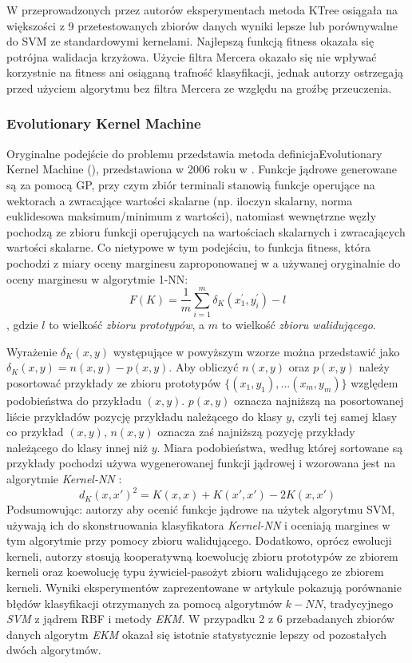W przeprowadzonych przez autorów eksperymentach metoda KTree osiągała na większości z 9 przetestowanych zbiorów danych wyniki lepsze lub porównywalne do SVM ze standardowymi kernelami. Najlepszą funkcją fitness okazała się potrójna walidacja krzyżowa. Użycie filtra Mercera okazało się nie wpływać korzystnie na fitness ani osiąganą trafność klasyfikacji, jednak autorzy ostrzegają przed użyciem algorytmu bez filtra Mercera ze względu na groźbę przeuczenia.

\subsubsection{Evolutionary Kernel Machine}
Oryginalne podejście do problemu przedstawia metoda definicja{Evolutionary Kernel Machine }(), przedstawiona w 2006 roku w \cite{gagne_genetic_2006}. Funkcje jądrowe generowane są za pomocą GP, przy czym zbiór terminali stanowią funkcje operujące na wektorach a zwracające wartości skalarne (np. iloczyn skalarny, norma euklidesowa maksimum/minimum z wartości), natomiast wewnętrzne węzły pochodzą ze zbioru funkcji operujących na wartościach skalarnych i zwracających wartości skalarne. Co nietypowe w tym podejściu, to funkcja fitness, która pochodzi z miary oceny marginesu zaproponowanej w \cite{Gilad-Bachrach:2004:MBF:1015330.1015352} a używanej oryginalnie do oceny marginesu w algorytmie 1-NN:
$$ F(K) = \frac{1}{m} \sum_{i=1}^m \delta_K(x_1^{'}, y_i^{'}) - l $$,
gdzie $l$ to wielkość \emph{zbioru prototypów}, a $m$ to wielkość \emph{zbioru walidującego}.

Wyrażenie $ \delta_K(x,y) $ występujące w powyższym wzorze można przedstawić jako $ \delta_K(x,y) = n(x,y) - p(x,y) $. Aby obliczyć $n(x,y)$ oraz $p(x,y)$ należy posortować przykłady ze zbioru prototypów $\{(x_1,y_1),...(x_m, y_m)\}$ względem podobieństwa do przykładu $(x, y)$. $p(x,y)$ oznacza najniższą na posortowanej liście przykładów pozycję przykładu należącego do klasy $y$, czyli tej samej klasy co przykład $(x,y)$, $n(x,y)$ oznacza zaś najniższą pozycję przykłady należącego do klasy innej niż $y$.
Miara podobieństwa, według której sortowane są przykłady pochodzi używa wygenerowanej funkcji jądrowej i wzorowana jest na algorytmie \emph{Kernel-NN} \cite{Yu:2002:KNA:607789.607852}:
$$ d_K(x, x')^2 = K(x, x) + K(x', x') - 2K(x, x') $$
Podsumowując: autorzy aby ocenić funkcje jądrowe na użytek algorytmu SVM, używają ich do skonstruowania klasyfikatora \emph{Kernel-NN} i oceniają margines w tym algorytmie przy pomocy zbioru walidującego.
Dodatkowo, oprócz ewolucji kerneli, autorzy stosują kooperatywną koewolucję zbioru prototypów ze zbiorem kerneli oraz koewolucję typu żywiciel-pasożyt zbioru walidującego ze zbiorem kerneli.
Wyniki eksperymentów zaprezentowane w artykule pokazują porównanie błędów klasyfikacji otrzymanych za pomocą algorytmów $ k-NN $, tradycyjnego \emph{SVM} z jądrem RBF i metody \emph{EKM}. W przypadku 2 z 6 przebadanych zbiorów danych algorytm \emph{EKM} okazał się istotnie statystycznie lepszy od pozostałych dwóch algorytmów.

